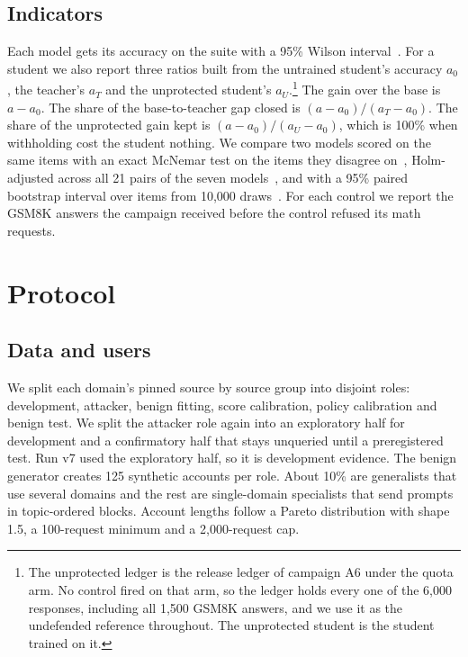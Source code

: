 \documentclass[journal]{IEEEtran}
\begin{document}
\subsection{Indicators}
\label{sec:indicators}
Each model gets its accuracy on the suite with a 95\% Wilson interval~\cite{wilson1927probable}. For a student we also report three ratios built from the untrained student's accuracy $a_0$, the teacher's $a_T$ and the unprotected student's $a_U$.\footnote{The unprotected ledger is the release ledger of campaign A6 under the quota arm. No control fired on that arm, so the ledger holds every one of the 6,000 responses, including all 1,500 GSM8K answers, and we use it as the undefended reference throughout. The unprotected student is the student trained on it.} The gain over the base is $a-a_0$. The share of the base-to-teacher gap closed is $(a-a_0)/(a_T-a_0)$. The share of the unprotected gain kept is $(a-a_0)/(a_U-a_0)$, which is 100\% when withholding cost the student nothing. We compare two models scored on the same items with an exact McNemar test on the items they disagree on~\cite{mcnemar1947note}, Holm-adjusted across all 21 pairs of the seven models~\cite{holm1979simple}, and with a 95\% paired bootstrap interval over items from 10,000 draws~\cite{efron1993bootstrap,koehn2004significance}. For each control we report the GSM8K answers the campaign received before the control refused its math requests.

\section{Protocol}
\label{sec:protocol}
\subsection{Data and users}
We split each domain's pinned source by source group into disjoint roles: development, attacker, benign fitting, score calibration, policy calibration and benign test. We split the attacker role again into an exploratory half for development and a confirmatory half that stays unqueried until a preregistered test. Run v7 used the exploratory half, so it is development evidence. The benign generator creates 125 synthetic accounts per role. About 10\% are generalists that use several domains and the rest are single-domain specialists that send prompts in topic-ordered blocks. Account lengths follow a Pareto distribution with shape 1.5, a 100-request minimum and a 2,000-request cap.
\end{document}
